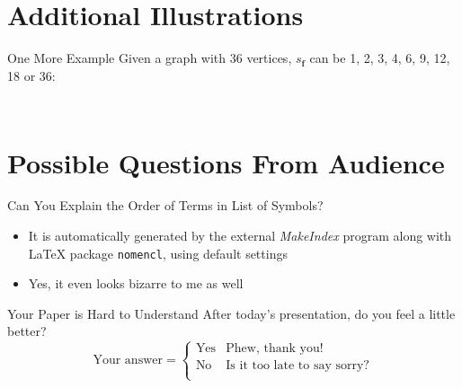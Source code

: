 
\section*{Additional Illustrations}

\begin{frame}{One More Example}
	Given a graph with 36 vertices, \(s_{\textbf{f}}\) can be 1, 2, 3, 4, 6, 9, 12, 18 or 36:
	\begin{columns}[c]
		\begin{column}{0.5\textwidth}
			\begin{figure}[ht]
				\centering
				
			\end{figure}
		\end{column}

		\begin{column}{0.5\textwidth}
			\centering
			\only<12-14>{\(6 \leq s_{\textbf{f}} \leq 9\)}
		\end{column}
	\end{columns}
\end{frame}

\section*{Possible Questions From Audience}

\begin{frame}{Can You Explain the Order of Terms in List of Symbols?}
	\begin{itemize}
		\item It is automatically generated by the external \textit{MakeIndex} program along with \LaTeX{} package \texttt{nomencl}, using default settings
		\item Yes, it even looks bizarre to me as well
	\end{itemize}
\end{frame}

\begin{frame}{Your Paper is Hard to Understand \textellipsis}
	After today's presentation, do you feel a little better?
	\[
		\text{Your answer} =
		\begin{cases}
			\text{Yes} & \text{Phew, thank you!} \\
			\text{No} & \text{Is it too late to say sorry?} \\
		\end{cases}
	\]
\end{frame}
